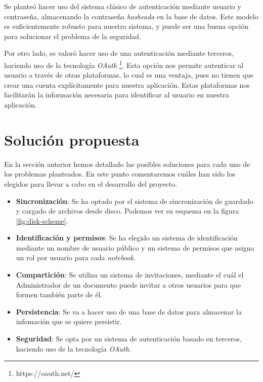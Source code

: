\documentclass[11pt,spanish,listoffigures]{tfgetsinf}
\begin{document}
Se planteó hacer uso del sistema clásico de autenticación mediante usuario y contraseña, almacenando la contraseña \textit{\gls{hash}eada} en la base de datos. Este modelo es suficientemente robusto para nuestro sistema, y puede ser una buena opción para solucionar el problema de la seguridad.

Por otro lado, se valoró hacer uso de una autenticación mediante terceros, haciendo uso de la tecnología \textit{OAuth} \footnote{https://oauth.net/}. Esta opción nos permite autenticar al usuario a través de otras plataformas, lo cual es una ventaja, pues no tienen que crear una cuenta explícitamente para nuestra aplicación. Estas plataformas nos facilitarán la información necesaria para identificar al usuario en nuestra aplicación.



\section{Solución propuesta}
\label{sec:solucion-propuesta}

En la sección anterior hemos detallado las posibles soluciones para cada uno de los problemas planteados. En este punto comentaremos cuáles han sido los elegidos para llevar a cabo en el desarrollo del proyecto.

\begin{itemize}

\item \textbf{Sincronización}: Se ha optado por el sistema de sincronización de guardado y cargado de archivos desde disco. Podemos ver su esquema en la figura \ref{fig:disk-scheme}. 

\item \textbf{Identificación y permisos}: Se ha elegido un sistema de identificación mediante un nombre de usuario público y un sistema de permisos que asigna un rol por usuario para cada \textit{notebook}.

\item \textbf{Compartición}: Se utiliza un sistema de invitaciones, mediante el cuál el Administrador de un documento puede invitar a otros usuarios para que formen también parte de él.

\item \textbf{Persistencia}: Se va a hacer uso de una base de datos para almacenar la infomación que se quiere persistir.

\item \textbf{Seguridad}: Se opta por un sistema de autenticación basado en terceros, haciendo uso de la tecnología \textit{OAuth}.

\end{itemize}
\end{document}
